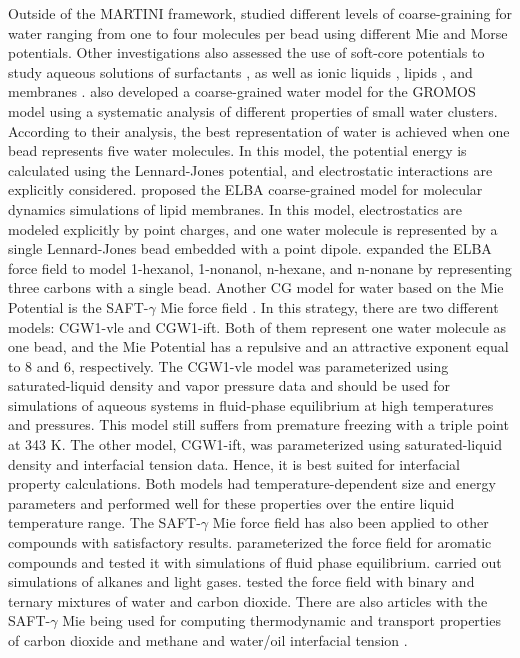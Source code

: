 Outside of the MARTINI framework,  studied different levels of coarse-graining for water ranging from one to four molecules per bead using different Mie and Morse potentials. Other investigations also assessed the use of soft-core potentials to study aqueous solutions of surfactants \cite{shinoda2007}, as well as ionic liquids \cite{bhargava2009}, lipids \cite{shinoda20102}, and membranes \cite{pantano2009}.  also developed a coarse-grained water model for the GROMOS model using a systematic analysis of different properties of small water clusters. According to their analysis, the best representation of water is achieved when one bead represents five water molecules. In this model, the potential energy is calculated using the Lennard-Jones potential, and electrostatic interactions are explicitly considered.  proposed the ELBA coarse-grained model for molecular dynamics simulations of lipid membranes. In this model, electrostatics are modeled explicitly by point charges, and one water molecule is represented by a single Lennard-Jones bead embedded with a point dipole.  expanded the ELBA force field to model 1-hexanol, 1-nonanol, n-hexane, and n-nonane by representing three carbons with a single bead. Another CG model for water based on the Mie Potential is the SAFT-$\gamma$ Mie force field \cite{lobanova2015}. In this strategy, there are two different models: CGW1-vle and CGW1-ift. Both of them represent one water molecule as one bead, and the Mie Potential has a repulsive and an attractive exponent equal to 8 and 6, respectively. The CGW1-vle model was parameterized using saturated-liquid density and vapor pressure data and should be used for simulations of aqueous systems in fluid-phase equilibrium at high temperatures and pressures. This model still suffers from premature freezing with a triple point at 343 K. The other model, CGW1-ift, was parameterized using saturated-liquid density and interfacial tension data. Hence, it is best suited for interfacial property calculations. Both models had temperature-dependent size and energy parameters and performed well for these properties over the entire liquid temperature range. The SAFT-$\gamma$ Mie force field has also been applied to other compounds with satisfactory results.  parameterized the force field for aromatic compounds and tested it with simulations of fluid phase equilibrium.  carried out simulations of alkanes and light gases.  tested the force field with binary and ternary mixtures of water and carbon dioxide. There are also articles with the SAFT-$\gamma$ Mie being used for computing thermodynamic and transport properties of carbon dioxide and methane \cite{cassiano1,cassiano2} and water/oil interfacial tension \cite{herdes2017}.  

